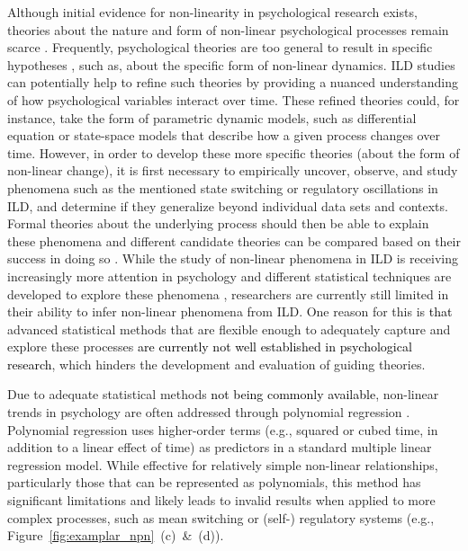 \documentclass[man, floatsintext]{apa7}
\begin{document}
Although initial evidence for non-linearity in psychological research exists,
theories about the nature and form of non-linear psychological processes remain
scarce \parencite{tan_time-varying_2011}. Frequently, psychological theories
are too general to result in specific hypotheses
\parencite{oberauer_addressing_2019}, such as, about the specific
form of non-linear dynamics. ILD studies can potentially help to refine such
theories by providing a nuanced understanding of how psychological variables
interact over time. These refined theories could, for instance, take the form
of parametric dynamic models, such as differential equation
\parencite{cooper_dynamical_2012} or state-space models
\parencite{durbin_time_2012} that describe how a given process changes over
time. However, in order to develop these more specific theories (about the form
of non-linear change), it is first necessary to empirically uncover, observe,
and study phenomena such as the mentioned state switching or regulatory
oscillations in ILD, and determine if they generalize beyond individual data
sets and contexts. Formal theories about the underlying process should then be
able to explain these phenomena and different candidate theories can be
compared based on their success in doing so \parencite{borsboom_theory_2021}.
While the study of non-linear phenomena in ILD is receiving increasingly more
attention in psychology and different statistical techniques are developed to
explore these phenomena \parencite{cui_unlocking_2023,humberg_estimating_2024},
researchers are currently still limited in their ability to infer non-linear
phenomena from ILD\@. One reason for this is \textcolor{black}{that} advanced
statistical methods that are flexible enough to adequately capture and explore
these processes \textcolor{black}{are currently not well established in
  psychological research}, which hinders the development and evaluation of
guiding theories.

Due to adequate statistical methods \textcolor{black}{not being commonly
  available}, non-linear trends in psychology are often addressed through
polynomial regression \parencite{jebb_time_2015}. Polynomial regression uses
higher-order terms (e.g., squared or cubed time, in addition to a linear
effect of time) as predictors in a standard multiple linear regression model.
While effective for relatively simple non-linear relationships, particularly
those that can be represented as polynomials, this method has significant
limitations and likely leads to invalid results when applied to more complex
processes, such as mean switching or (self-) regulatory systems (e.g.,
Figure~\ref{fig:examplar_npn}~(c)~\&~(d)).
\end{document}
